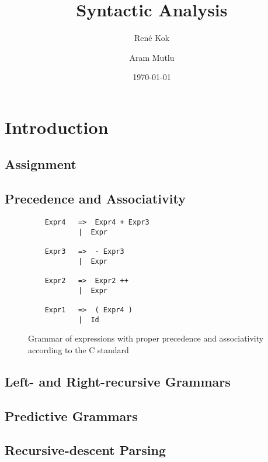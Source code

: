 \documentclass[hidelinks]{uva-inf-article}
\title{Syntactic Analysis}
\author{René Kok}
\author{Aram Mutlu}
\date{\today}
\begin{document}
\maketitle

\section{Introduction}
\begin{flushleft}


\newpage
\section{Assignment}
\subsection{Precedence and Associativity}
\begin{figure}[h]
    \begin{lstlisting}
    Expr4   =>  Expr4 + Expr3 
            |  Expr

    Expr3   =>  - Expr3 
            |  Expr

    Expr2   =>  Expr2 ++ 
            |  Expr
            
    Expr1   =>  ( Expr4 ) 
            |  Id
    \end{lstlisting}
    \caption{Grammar of expressions with proper precedence and associativity according to the C standard}
    \label{fig:ThCoStep1}
\end{figure}
\subsection{Left- and Right-recursive Grammars}
\subsection{Predictive Grammars}
\subsection{Recursive-descent Parsing}

\end{flushleft}
\end{document}

